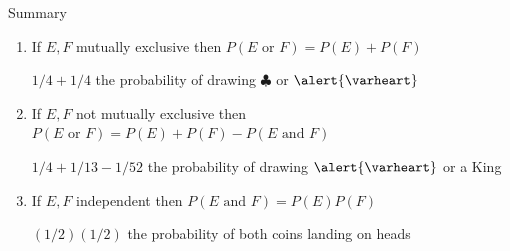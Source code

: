 \documentclass[handout]{beamer}
\theoremstyle{definition}
\begin{document}
\begin{frame}{Summary}
\begin{enumerate}
\item If $E,F$ mutually exclusive then
$P\left(\text{$E$ or $F$}\right)=P\left(E\right)+P\left(F\right)$
\begin{example} $1/4+1/4$ the probability
of drawing $\clubsuit$ or $\alert{\varheart}$ \end{example}
\item If $E,F$ \alert{not} mutually exclusive then
$P\left(\text{$E$ or $F$}\right)=P\left(E\right)+P\left(F\right)
-P\left(\text{$E$ and $F$}\right)$
\begin{example} $1/4+1/13-1/52$ the probability
of drawing $\alert{\varheart}$ or a King\end{example}
\item If $E,F$ independent then
$P\left(\text{$E$ and $F$}\right)=P\left(E\right)P\left(F\right)$
\begin{example} $\left(1/2\right)\left(1/2\right)$ the probability
of both coins landing on heads\end{example}
\end{enumerate}
\end{frame}

\end{document}
